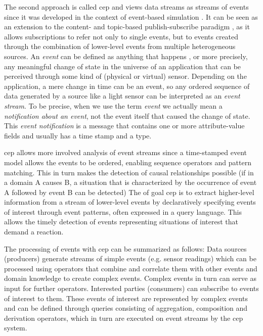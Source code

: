 The second approach is called \gls{cep} and views data streams as streams of events since it was developed in the context of event-based simulation \cite{Luckham}.
It can be seen as an extension to the content- and topic-based publish-subscribe paradigm \cite{Cugola2012}, as it allows subscriptions to refer not only to single events, but to events created through the combination of lower-level events from multiple heterogeneous sources.
An \textit{event} can be defined as anything that happens \cite{Chandy2011}, or more precisely, any meaningful change of state in the universe of an application that can be perceived through some kind of (physical or virtual) sensor. Depending on the application, a mere change in time can be an event, so any ordered sequence of data generated by a source like a light sensor can be interpreted as an \textit{event stream}. To be precise, when we use the term \textit{event} we actually mean a \textit{notification about an event}, not the event itself that caused the change of state. This \textit{event notification} is a message that contains one or more attribute-value fields and usually has a time stamp and a type.

\gls{cep} allows more involved analysis of event streams since a time-stamped event model allows the events to be ordered, enabling sequence operators and pattern matching. This in turn makes the detection of causal relationships possible (if in a domain A causes B, a situation that is characterized by the occurrence of event A followed by event B can be detected)
The of goal \gls{cep} is to extract higher-level information from a stream of lower-level events by declaratively specifying events of interest through event patterns, often expressed in a query language. This allows the timely detection of events representing situations of interest that demand a reaction. 

The processing of events with \gls{cep} can be summarized as follows: Data sources (producers) generate streams of simple events (e.g. sensor readings) which can be processed using operators that combine and correlate them with other events and domain knowledge to create complex events. Complex events in turn can serve as input for further operators. Interested parties (consumers) can subscribe to events of interest to them. These events of interest are represented by complex events and can be defined through queries consisting of aggregation, composition and derivation operators, which in turn are executed on event streams by the \gls{cep} system.

